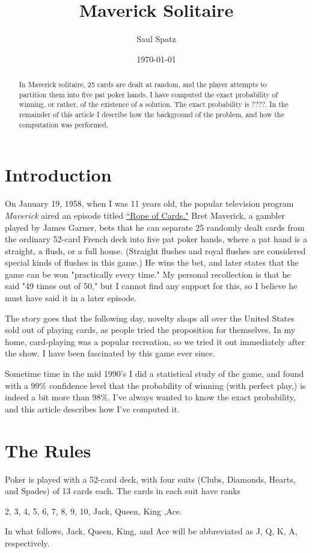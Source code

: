 \documentclass [12pt, letterpaper] {article}
\title {Maverick Solitaire}
\author {Saul Spatz}
\date {\today}
\begin{document}
\maketitle
\begin {abstract}
In Maverick solitaire, 25 cards are dealt at random, 
and the player attempts to partition them into five pat 
poker hands.  I have computed the exact probability of
winning, or rather, of the existence of a solution.  
The exact probability is ????.  In the remainder of this
article I describe how the background of the problem, and
how the computation was performed.   
\end {abstract}
\section*{Introduction}
On January 19, 1958, when I was 11 years old, the popular television program 
\textit{Maverick} aired an episode titled 
\href{https://www.imdb.com/title/tt0644480/}{``Rope of Cards."} 
Bret Maverick, a gambler played by James Garner, bets that 
he can separate 25 randomly dealt cards from the ordinary 52-card 
French deck into five pat poker hands, where a pat hand is a 
straight, a flush, or a full house.  (Straight flushes and royal
flushes are considered special kinds of flushes in this game.)
He wins the bet, and later  states that the game can be won
"practically every time."  My personal recollection is that
he said "49 times out of 50," but I cannot find any support
for this, so I believe he must have said it in a later episode.

The story goes that the following day, novelty shops all over the
United States sold out of playing cards, as people tried the 
proposition for themselves.  In my home, card-playing was a popular
recreation, so we tried it out immediately after the show.  I have been
fascinated by this game ever since.  

Sometime time in the mid 1990's I did a statistical study of the game, and
found with a 99\% confidence level that the probability of winning 
(with perfect play,) is indeed a bit more than 98\%.  I've always wanted 
to know the exact probability, and this article describes how I've computed it.

\section* {The Rules}
Poker is played with a 52-card deck, with four suits (Clubs, Diamonds, Hearts, and Spades)
of 13 cards each.  The cards in each suit have ranks 
\begin{center}
         2, 3, 4, 5, 6, 7, 8, 9, 10, Jack, Queen, King ,Ace.
\end{center}
In what follows, Jack, Queen, King, and Ace will be abbreviated as J, Q, K, A, respectively. 
\end{document}
